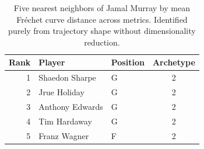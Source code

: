 \begin{table}[htbp]
  \centering\small
  \begin{tabular}{rllc}
    \toprule
    Rank & Player & Position & Archetype \\
    \midrule
    1 & Shaedon Sharpe & G & 2 \\
    2 & Jrue Holiday & G & 2 \\
    3 & Anthony Edwards & G & 2 \\
    4 & Tim Hardaway & G & 2 \\
    5 & Franz Wagner & F & 2 \\
    \bottomrule
  \end{tabular}
  \caption{Five nearest neighbors of Jamal Murray by mean Fr\'{e}chet curve distance across metrics. Identified purely from trajectory shape without dimensionality reduction.}
  \label{tab:Jamal_Murray_frechet_curve_neighbors}
\end{table}

